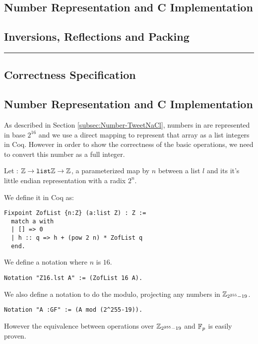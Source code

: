 \subsection{Number Representation and C Implementation}

\subsection{Inversions, Reflections and Packing}



\vspace{1em}
\hrule
\vspace{1em}




\subsection{Correctness Specification}


\subsection{Number Representation and C Implementation}

As described in Section \ref{subsec:Number-TweetNaCl}, numbers in  are represented
in base $2^{16}$ and we use a direct mapping to represent that array as a list
integers in Coq. However in order to show the correctness of the basic operations,
we need to convert this number as a full integer.
\begin{definition}
Let  : $\mathbb{Z} \rightarrow \texttt{list} \mathbb{Z} \rightarrow \mathbb{Z}$, a parameterized map by $n$ between a list $l$ and its
it's little endian representation with a radix $2^n$.
\end{definition}
We define it in Coq as:
\begin{lstlisting}[language=Coq]
Fixpoint ZofList {n:Z} (a:list Z) : Z :=
  match a with
  | [] => 0
  | h :: q => h + (pow 2 n) * ZofList q
  end.
\end{lstlisting}
We define a notation where $n$ is $16$.
\begin{lstlisting}[language=Coq]
Notation "Z16.lst A" := (ZofList 16 A).
\end{lstlisting}
We also define a notation to do the modulo, projecting any numbers in $\mathbb{Z}_{2^{255}-19}$.
\begin{lstlisting}[language=Coq]
Notation "A :GF" := (A mod (2^255-19)).
\end{lstlisting}
However the equivalence between operations over $\mathbb{Z}_{2^{255}-19}$ and $\mathbb{F}_{p}$ is easily proven.

